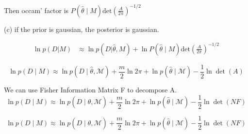 \documentclass[11pt]{article}
\newcommand{\mbf}[1]{{\boldsymbol{\mathbf{#1}}}}
\renewcommand{\bm}{\mbf}
\begin{document}
\begin{enumerate}
Then occam' factor is $P\left(\hat{\theta} \mid M\right) \text{det}(\frac{A}{2 \pi})^{-1/2}$


(c)
if the prior is gaussian, the posterior is gaussian.


\begin{align}
\ln p(D|M) &\approx \ln p(D|\hat{\theta} ,M) + \ln P\left(\hat{\theta} \mid M\right) \text{det}(\frac{A}{2 \pi})^{-1/2} 
\end{align}


\begin{equation}
    \ln p(D \mid M) \approx \ln p(D \mid \hat{\theta}, \mathcal{M})+\frac{m}{2} \ln 2 \pi+\ln p(\hat{\theta} \mid \mathcal{M})-\frac{1}{2} \ln \operatorname{det}(A)
\end{equation}

We can use Fisher Information Matrix F to decompose A.
\begin{equation}
    \ln p(D \mid M) \approx \ln p(D \mid \hat{\theta}, \mathcal{M})+\frac{m}{2} \ln 2 \pi+\ln p(\hat{\theta} \mid \mathcal{M})-\frac{1}{2} \ln \operatorname{det}(N F)
\end{equation}

\begin{equation}
    \ln p(D \mid M) \approx \ln p(D \mid \hat{\theta}, \mathcal{M})+\frac{m}{2} \ln 2 \pi+\ln p(\hat{\theta} \mid \mathcal{M})-\frac{1}{2} \ln \operatorname{det}(N F)
\end{equation}


\end{enumerate}
\end{document}
